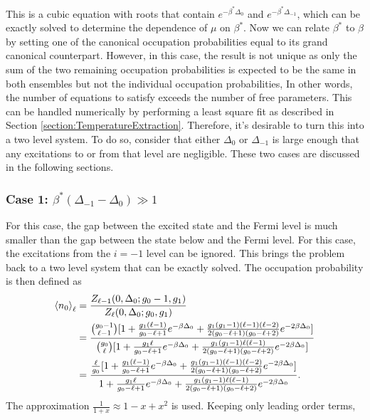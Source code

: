 This is a cubic equation with roots that contain $e^{-\beta^*\Delta_0}$ and $e^{-\beta^*\Delta_{-1}}$, which can be exactly solved to determine the dependence of $\mu$ on $\beta^*$. Now we can relate $\beta^*$ to $\beta$ by setting one of the canonical occupation probabilities equal to its grand canonical counterpart. However, in this case, the result is not unique as only the sum of the two remaining occupation probabilities is expected to be the same in both ensembles but not the individual occupation probabilities, In other words, the number of equations to satisfy exceeds the number of free parameters.
This can  be handled numerically by performing a least square fit as described in Section \ref{section:TemperatureExtraction}. %
Therefore, it's desirable to turn this into a two level system. To do so, consider that either $\Delta_0$ or $\Delta_{-1}$ is large enough that any excitations to or from that level are negligible. These two cases are discussed in the following sections. 

\subsubsection{Case 1: $\beta^*(\Delta_{-1}-\Delta_0)\gg 1$} \label{case1}
For this case, the gap between the excited state and the Fermi level is much smaller than the gap between the state below and the Fermi level. For this case, the excitations from the $i=-1$ level can be ignored. This brings the problem back to a two level system that can be exactly solved. The occupation probability is then defined as
\begin{align}
    \left<{n_0}\right>_\ell&=\frac{Z_{\ell-1}(0,\Delta_0;g_0-1,g_1)}{Z_\ell(0,\Delta_0;g_0,g_1)}\nonumber\\
    &=\frac{{g_0-1\choose \ell-1}[1+\frac{g_1(\ell-1)}{g_0-\ell+1}e^{-\beta\Delta_0} +\frac{g_1(g_1-1)(\ell-1)(\ell-2)}{2(g_0-\ell+1)(g_0-\ell+2)}e^{-2\beta\Delta_0}]}{{g_0\choose \ell}[1+\frac{g_1 \ell}{g_0-\ell+1}e^{-\beta\Delta_0} +\frac{g_1(g_1-1)\ell(\ell-1)}{2(g_0-\ell+1)(g_0-\ell+2)}e^{-2\beta\Delta_0}]}\nonumber\\
    &=\frac{\frac{\ell}{g_0} [1+\frac{g_1(\ell-1)}{g_0-\ell+1}e^{-\beta\Delta_0} +\frac{g_1(g_1-1)(\ell-1)(\ell-2)}{2(g_0-\ell+1)(g_0-\ell+2)}e^{-2\beta\Delta_0}]}{1+\frac{g_1 \ell}{g_0-\ell+1}e^{-\beta\Delta_0} +\frac{g_1(g_1-1)\ell(\ell-1)}{2(g_0-\ell+1)(g_0-\ell+2)}e^{-2\beta\Delta_0}}.
\end{align}
The approximation $\frac{1}{1+x}\approx 1-x+x^2$ is used. Keeping only leading order terms,

